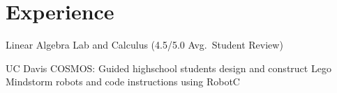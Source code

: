 \documentclass[letterpaper]{deedy-resume} %
\begin{document}
\begin{minipage}[t]{0.66\textwidth} %


\section{Experience}






\vspace{\topsep} %
\begin{tightitemize}
    \item Linear Algebra Lab and Calculus (4.5/5.0 Avg.~Student Review)
    \item UC Davis COSMOS: Guided highschool students design and construct Lego Mindstorm robots and code instructions using RobotC
\end{tightitemize}

\vspace{7pt}



\end{minipage}
\end{document}
